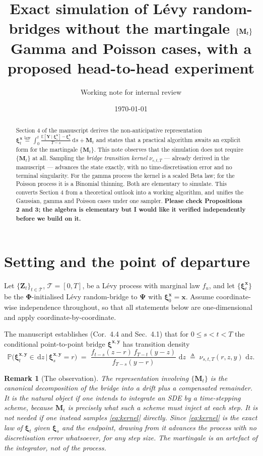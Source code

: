 \documentclass[11pt,a4paper]{article}
\title{Exact simulation of L\'evy random-bridges without the martingale $\{\Mb_t\}$\\
\large Gamma and Poisson cases, with a proposed head-to-head experiment}
\author{Working note for internal review}
\date{\today}
\newtheorem{rem}[prop]{Remark}
\def\E{\mathbb{E}}
\def\P{\mathbb{P}}
\def\T{\mathcal{T}}
\def\d{\,\mathrm{d}}
\def\xib{\boldsymbol{\xi}}
\def\Psib{\boldsymbol{\Psi}}
\def\Phib{\boldsymbol{\Phi}}
\def\Yb{\boldsymbol{Y}}
\def\Zb{\mathbf{Z}}
\def\Mb{\mathbf{M}}
\begin{document}
\maketitle

\begin{abstract}
Section 4 of the manuscript derives the non-anticipative representation
$\xib^{\boldsymbol{x}}_t \overset{\text{law}}{=} \int_0^t \frac{\E[\Yb\mid\xib^{\boldsymbol{x}}_s]-\xib^{\boldsymbol{x}}_s}{T-s}\d s + \Mb_t$
and states that a practical algorithm awaits an explicit form for the martingale
$\{\Mb_t\}$. This note observes that the simulation does not require $\{\Mb_t\}$ at
all. Sampling the \emph{bridge transition kernel} $\nu_{s,t,T}$ --- already derived in
the manuscript --- advances the state exactly, with no time-discretisation error and
no terminal singularity. For the gamma process the kernel is a scaled Beta law; for
the Poisson process it is a Binomial thinning. Both are elementary to simulate.
This converts Section 4 from a theoretical outlook into a working algorithm, and
unifies the Gaussian, gamma and Poisson cases under one sampler.
\textbf{Please check Propositions 2 and 3; the algebra is elementary but I would like
it verified independently before we build on it.}
\end{abstract}

\section{Setting and the point of departure}

Let $\{\Zb_t\}_{t\in\T}$, $\T=[0,T]$, be a L\'evy process with marginal law
$f_u$, and let $\{\xib^{\boldsymbol{x}}_t\}$ be the $\Phib$-initialised L\'evy
random-bridge to $\Psib$ with $\xib^{\boldsymbol{x}}_0=\boldsymbol{x}$. Assume
coordinate-wise independence throughout, so that all statements below are
one-dimensional and apply coordinate-by-coordinate.

The manuscript establishes (Cor.~4.4 and Sec.~4.1) that for
$0\le s<t<T$ the conditional point-to-point bridge
$\xib^{\boldsymbol{x},\boldsymbol{y}}$ has transition density
\begin{equation}
\label{eq:kernel}
\P\big(\xib^{\boldsymbol{x},\boldsymbol{y}}_t\in\d z \,\big|\, \xib^{\boldsymbol{x},\boldsymbol{y}}_s=r\big)
\;=\;\frac{f_{t-s}(z-r)\,f_{T-t}(y-z)}{f_{T-s}(y-r)}\,\d z
\;\triangleq\;\nu_{s,t,T}(r,z,y)\,\d z .
\end{equation}

\begin{rem}[The observation]
\label{rem:main}
The representation involving $\{\Mb_t\}$ is the canonical decomposition of the
bridge into a drift plus a compensated remainder. It is the natural object if one
intends to \emph{integrate an SDE} by a time-stepping scheme, because $\Mb_t$ is
precisely what such a scheme must inject at each step. It is not needed if one
instead \emph{samples \eqref{eq:kernel} directly}. Since \eqref{eq:kernel} is the
exact law of $\xib_t$ given $\xib_s$ and the endpoint, drawing from it advances the
process with no discretisation error whatsoever, for any step size. The martingale
is an artefact of the integrator, not of the process.
\end{rem}
\end{document}
